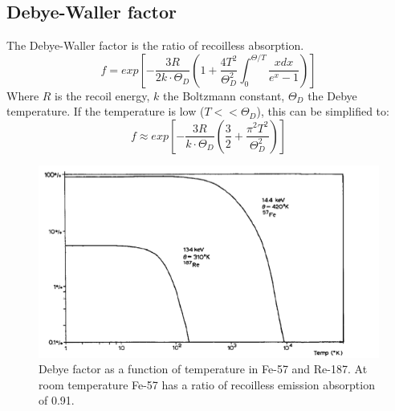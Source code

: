 \subsection{Debye-Waller factor}
The Debye-Waller factor is the ratio of recoilless absorption.
\begin{equation}
f = exp \left[ -\frac{3R}{2k \cdot \Theta_D} \left(1+ \frac{4T^2}{\Theta_D^2}\int_{0}^{\Theta/T}\frac{xdx}{e^x-1}\right) \right]
\end{equation}
Where $R$ is the recoil energy, $k$ the Boltzmann constant, $\Theta_D$ the Debye temperature. 
If the temperature is low ($T<<\Theta_D$), this can be simplified to:
\begin{equation}
f \approx exp\left[ -\frac{3R}{k \cdot \Theta_D} \left( \frac{3}{2}+\frac{\pi^2 T^2}{\Theta_D^2}\right) \right]
\end{equation}

\begin{figure}
\centering
\includegraphics[width=0.7\linewidth]{graphics/Debeyfactor}
\caption[Debey factors]{Debye factor as a function of temperature in Fe-57 and Re-187. At room temperature Fe-57 has a ratio of recoilless emission absorption of 0.91. \cite{anleitung}}
\label{fig:principles:Debeyfactor}
\end{figure}

